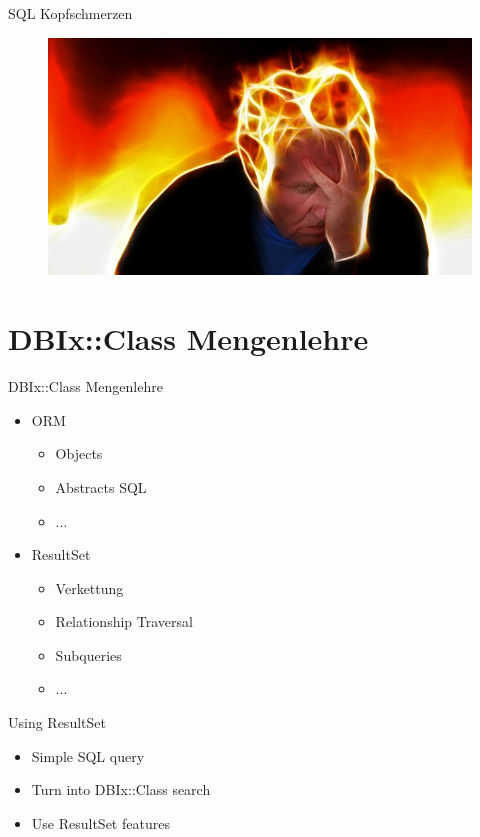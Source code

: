 \begin{frame}{SQL Kopfschmerzen}
\begin{figure}[!ht]
\centering
\includegraphics[width=1\linewidth]{img/stress.jpg}
\end{figure}
\end{frame}

\section{DBIx::Class Mengenlehre}


\begin{frame}{DBIx::Class Mengenlehre}
\begin{itemize}
\item ORM
\begin{itemize}
\item Objects
\item Abstracts SQL
\item ...
\end{itemize}
\item ResultSet
\begin{itemize}
\item Verkettung
\item Relationship Traversal
\item Subqueries
\item ...
\end{itemize}
\end{itemize}
\end{frame}

\begin{frame}{Using ResultSet}
\begin{itemize}
\item Simple SQL query
\item Turn into DBIx::Class search
\item Use ResultSet features
\end{itemize}
\end{frame}

